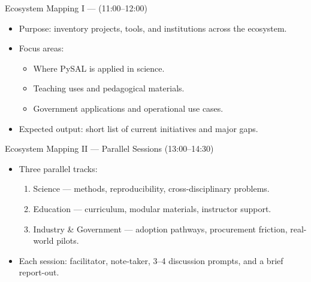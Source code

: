 \documentclass[11pt, aspectratio=169]{beamer}
\begin{document}
\begin{frame}{Ecosystem Mapping I — (11:00--12:00)}
  \begin{itemize}
    \item Purpose: inventory projects, tools, and institutions across the ecosystem.
    \item Focus areas:
      \begin{itemize}
        \item Where PySAL is applied in science.
        \item Teaching uses and pedagogical materials.
        \item Government applications and operational use cases.
      \end{itemize}
    \item Expected output: short list of current initiatives and major gaps.
  \end{itemize}

\end{frame}

\begin{frame}{Ecosystem Mapping II — Parallel Sessions (13:00--14:30)}
  \begin{itemize}
    \item Three parallel tracks:
      \begin{enumerate}
        \item Science — methods, reproducibility, cross-disciplinary problems.
        \item Education — curriculum, modular materials, instructor support.
        \item Industry \& Government — adoption pathways, procurement friction, real-world pilots.
      \end{enumerate}
    \item Each session: facilitator, note-taker, 3–4 discussion prompts, and a brief report-out.
  \end{itemize}

\end{frame}
\end{document}
